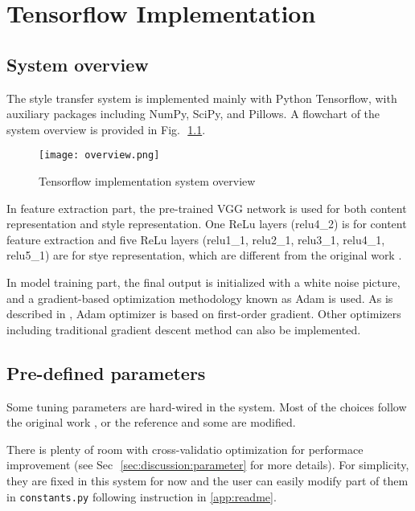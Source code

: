 
\chapter{Tensorflow Implementation}
\label{chap:implementation}


\section{System overview}
\label{sec:implementation:overview}

The style transfer system is implemented mainly with Python Tensorflow,
with auxiliary packages including NumPy, SciPy, and Pillows.
A flowchart of the system overview is provided in Fig.\,~\ref{fig:overview}.

    \begin{figure}[!hbt]
    \center
    \texttt{[image: overview.png]}
    \caption{Tensorflow implementation system overview}
    \label{fig:overview}
    \end{figure}

In feature extraction part, the pre-trained VGG network is used for both
content representation and style representation.
One ReLu layers (relu4\_2) is for content feature extraction
and five ReLu layers (relu1\_1, relu2\_1, relu3\_1, relu4\_1, relu5\_1) are for 
stye representation, which are different from the original work \cite{Gatys:2016gj}.

In model training part, the final output is initialized with a white noise picture,
and a gradient-based optimization methodology known as Adam is used.
As is described in \cite{kingma2014adam}, Adam optimizer is based on first-order gradient.
Other optimizers including traditional gradient descent method can also be implemented.


\section{Pre-defined parameters}
\label{sec:implementation:parameters}

Some tuning parameters are hard-wired in the system.
Most of the choices follow the original work \cite{Gatys:2016gj},
or the reference \cite{athalye2015neuralstyle} and some are modified.

There is plenty of room with cross-validatio optimization for performace improvement
(see Sec\,~\ref{sec:discussion:parameter} for more details).
For simplicity, they are fixed in this system for now and the user can easily modify part of them
in \texttt{constants.py} following instruction in \ref{app:readme}.

